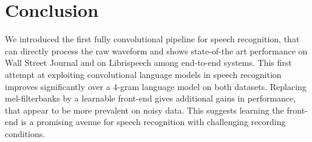 \documentclass[a4paper]{article}
\begin{document}
\section{Conclusion}

We introduced the first fully convolutional pipeline for speech recognition, that can directly process the raw waveform and shows state-of-the art performance on Wall Street Journal and on Librispeech among end-to-end systems. This first attempt at exploiting convolutional language models in speech recognition improves significantly over a $4$-gram language model on both datasets. Replacing mel-filterbanks by a learnable front-end gives additional gains in performance, that appear to be more prevalent on noisy data. This suggests learning the front-end is a promising avenue for speech recognition with challenging recording conditions.





\end{document}
